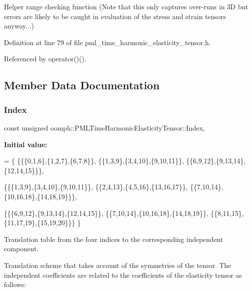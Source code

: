 Helper range checking function (Note that this only captures over-\/runs in 3D but errors are likely to be caught in evaluation of the stress and strain tensors anyway...) 



Definition at line 79 of file pml\+\_\+time\+\_\+harmonic\+\_\+elasticity\+\_\+tensor.\+h.



Referenced by operator()().



\subsection{Member Data Documentation}
\mbox{\label{classoomph_1_1PMLTimeHarmonicElasticityTensor_a26ab48ec65967f3ff8687d2208b337f6}} 
\subsubsection{\texorpdfstring{Index}{Index}}
{\footnotesize\ttfamily const unsigned oomph\+::\+P\+M\+L\+Time\+Harmonic\+Elasticity\+Tensor\+::\+Index\hspace{0.3cm}{\ttfamily [static]}, {\ttfamily [private]}}

{\bfseries Initial value\+:}
\begin{DoxyCode}
= 
 \{
  \{\{\{0,1,6\},\{1,2,7\},\{6,7,8\}\},
   \{\{1,3,9\},\{3,4,10\},\{9,10,11\}\},
   \{\{6,9,12\},\{9,13,14\},\{12,14,15\}\}\},
   
  \{\{\{1,3,9\},\{3,4,10\},\{9,10,11\}\},
   \{\{2,4,13\},\{4,5,16\},\{13,16,17\}\},
   \{\{7,10,14\},\{10,16,18\},\{14,18,19\}\}\},
  
  \{\{\{6,9,12\},\{9,13,14\},\{12,14,15\}\},
   \{\{7,10,14\},\{10,16,18\},\{14,18,19\}\},
   \{\{8,11,15\},\{11,17,19\},\{15,19,20\}\}\}
 \}
\end{DoxyCode}


Translation table from the four indices to the corresponding independent component. 

Translation scheme that takes account of the symmetries of the tensor. The independent coefficients are related to the coefficients of the elasticity tensor as follows\+:

